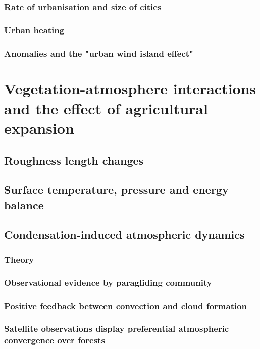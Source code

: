 \subsubsection{Rate of urbanisation and size of cities}

\subsubsection{Urban heating}

\subsubsection{Anomalies and the "urban wind island effect"}

\section{Vegetation-atmosphere interactions and the effect of agricultural expansion}

\subsection{Roughness length changes}

\subsection{Surface temperature, pressure and energy balance}

\subsection{Condensation-induced atmospheric dynamics}

\subsubsection{Theory}

\subsubsection{Observational evidence by paragliding community}

\subsubsection{Positive feedback between convection and cloud formation}

\subsubsection{Satellite observations display preferential atmospheric convergence over forests}

